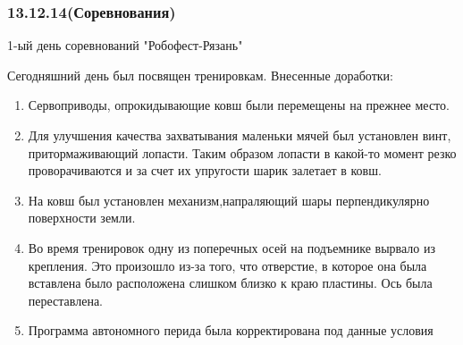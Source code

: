 \subsubsection{13.12.14(Соревнования)}
\begin{center}
	1-ый день соревнований "Робофест-Рязань"
\end{center}
Сегодняшний день был посвящен тренировкам.
Внесенные доработки:
\begin{enumerate}
	\item Сервоприводы, опрокидывающие ковш были перемещены на прежнее место.
	
	\item Для улучшения качества захватывания маленьки мячей был установлен винт, притормаживающий лопасти. Таким образом лопасти в какой-то момент резко проворачиваются и за счет их упругости шарик залетает в ковш.
	
	\item На ковш был установлен механизм,напраляющий шары перпендикулярно поверхности земли.
	
	\item Во время тренировок одну из поперечных осей на подъемнике вырвало из крепления. Это произошло из-за того, что отверстие, в которое она была вставлена было расположена слишком близко к краю пластины. Ось была переставлена.
	
    \item Программа автономного перида была корректирована под данные условия
	
\end{enumerate}
\fillpage